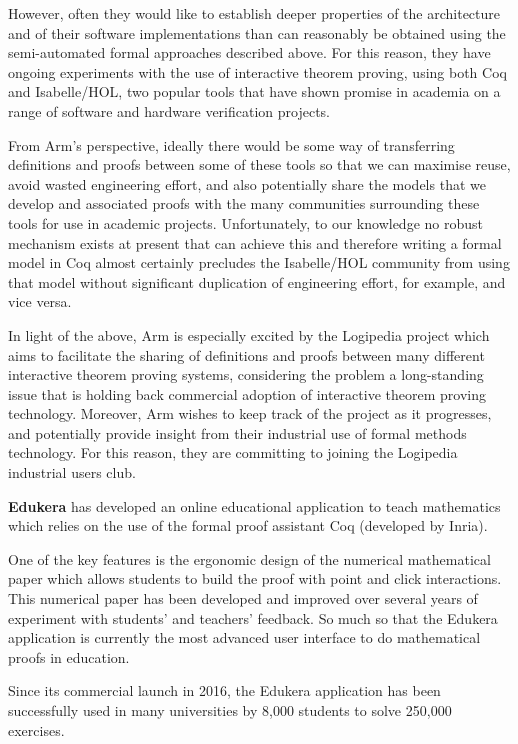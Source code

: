However, often they would like to establish deeper properties of the
architecture and of their software implementations than can reasonably
be obtained using the semi-automated formal approaches described
above. For this reason, they have ongoing experiments with the use of
interactive theorem proving, using both Coq and Isabelle/HOL, two
popular tools that have shown promise in academia on a range of
software and hardware verification projects.

From Arm’s perspective, ideally there would be some way of
transferring definitions and proofs between some of these tools so
that we can maximise reuse, avoid wasted engineering effort, and also
potentially share the models that we develop and associated proofs
with the many communities surrounding these tools for use in academic
projects. Unfortunately, to our knowledge no robust mechanism exists
at present that can achieve this and therefore writing a formal model
in Coq almost certainly precludes the Isabelle/HOL community from
using that model without significant duplication of engineering
effort, for example, and vice versa.

In light of the above, Arm is especially excited by the Logipedia
project which aims to facilitate the sharing of definitions and proofs
between many different interactive theorem proving systems,
considering the problem a long-standing issue that is holding back
commercial adoption of interactive theorem proving technology.
Moreover, Arm wishes to keep track of the project as it progresses,
and potentially provide insight from their industrial use of formal
methods technology. For this reason, they are committing to joining
the Logipedia industrial users club.

{\bf Edukera} has developed an online educational application to teach
mathematics which relies on the use of the formal proof assistant Coq
(developed by Inria).

One of the key features is the ergonomic design of the numerical
mathematical paper which allows students to build the proof with point
and click interactions. This numerical paper has been developed and
improved over several years of experiment with students' and teachers'
feedback. So much so that the Edukera application is currently the
most advanced user interface to do mathematical proofs in education.

Since its commercial launch in 2016, the Edukera application has been
successfully used in many universities by 8,000 students to solve
250,000 exercises.

